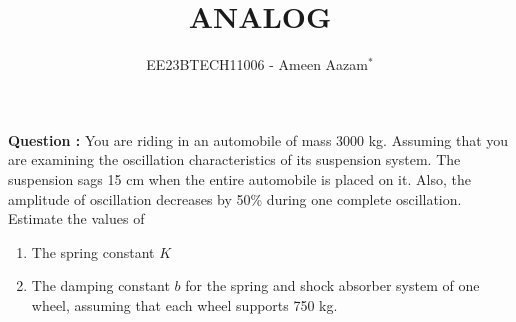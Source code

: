\documentclass[journal,12pt,twocolumn]{IEEEtran}
\theoremstyle{remark}
\begin{document}

\vspace{3cm}

\title{ANALOG}
\author{EE23BTECH11006 - Ameen Aazam$^{*}$%
}
\maketitle
\newpage
\bigskip

\renewcommand{\thefigure}{\theenumi}
\renewcommand{\thetable}{\theenumi}

\vspace{3cm}
\textbf{Question :}
You are riding in an automobile of mass 3000 kg. Assuming that you are examining the oscillation characteristics of its suspension system. The suspension sags 15 cm when the entire automobile is placed on it. Also, the amplitude of oscillation decreases by 50\% during one complete oscillation. Estimate the values of
\begin{enumerate}[label=(\alph*)]
    \item The spring constant \( K \)
    \item The damping constant \( b \) for the spring and shock absorber system of one wheel, assuming that each wheel supports 750 kg.
\end{enumerate}
\end{document}
